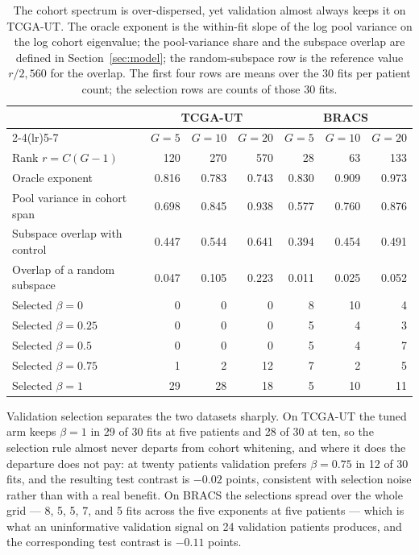 \begin{table}[htbp]
\centering
\small
\renewcommand{\arraystretch}{1.15}
\begin{tabular}{@{}lrrrrrr@{}}
\toprule
 & \multicolumn{3}{c}{TCGA-UT} & \multicolumn{3}{c}{BRACS} \\
\cmidrule(lr){2-4}\cmidrule(lr){5-7}
 & $G=5$ & $G=10$ & $G=20$ & $G=5$ & $G=10$ & $G=20$ \\
\midrule
Rank $r=C(G-1)$ & 120 & 270 & 570 & 28 & 63 & 133 \\
Oracle exponent & 0.816 & 0.783 & 0.743 & 0.830 & 0.909 & 0.973 \\
Pool variance in cohort span & 0.698 & 0.845 & 0.938 & 0.577 & 0.760 & 0.876 \\
Subspace overlap with control & 0.447 & 0.544 & 0.641 & 0.394 & 0.454 & 0.491 \\
Overlap of a random subspace & 0.047 & 0.105 & 0.223 & 0.011 & 0.025 & 0.052 \\
\addlinespace
Selected $\beta=0$ & 0 & 0 & 0 & 8 & 10 & 4 \\
Selected $\beta=0.25$ & 0 & 0 & 0 & 5 & 4 & 3 \\
Selected $\beta=0.5$ & 0 & 0 & 0 & 5 & 4 & 7 \\
Selected $\beta=0.75$ & 1 & 2 & 12 & 7 & 2 & 5 \\
Selected $\beta=1$ & 29 & 28 & 18 & 5 & 10 & 11 \\
\bottomrule
\end{tabular}
\caption{The cohort spectrum is over-dispersed, yet validation almost always keeps it on TCGA-UT. The oracle exponent is the within-fit slope of the log pool variance on the log cohort eigenvalue; the pool-variance share and the subspace overlap are defined in Section~\ref{sec:model}; the random-subspace row is the reference value $r/2{,}560$ for the overlap. The first four rows are means over the 30 fits per patient count; the selection rows are counts of those 30 fits.}
\label{tab:diagnostics}
\end{table}

\noindent Validation selection separates the two datasets sharply. On TCGA-UT the tuned arm keeps $\beta=1$ in 29 of 30 fits at five patients and 28 of 30 at ten, so the selection rule almost never departs from cohort whitening, and where it does the departure does not pay: at twenty patients validation prefers $\beta=0.75$ in 12 of 30 fits, and the resulting test contrast is $-0.02$ points, consistent with selection noise rather than with a real benefit. On BRACS the selections spread over the whole grid --- 8, 5, 5, 7, and 5 fits across the five exponents at five patients --- which is what an uninformative validation signal on 24 validation patients produces, and the corresponding test contrast is $-0.11$ points.

